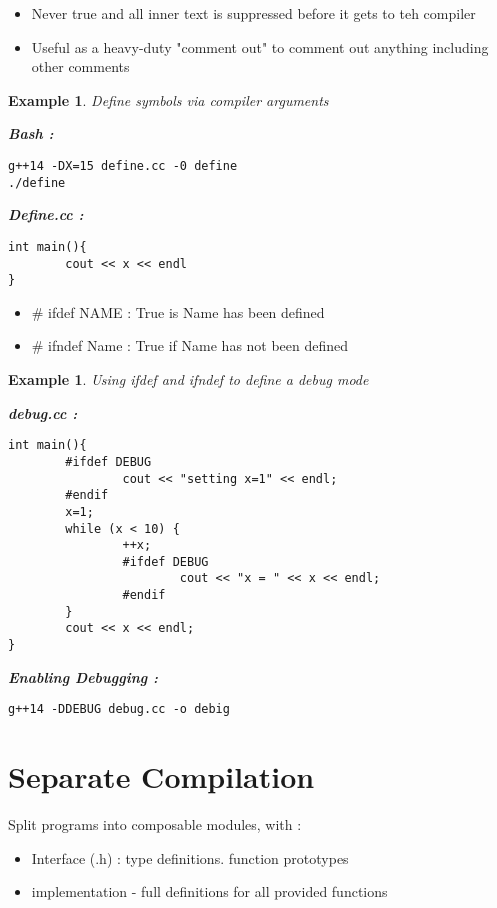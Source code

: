 \documentclass{article}
\newtheorem{ex}[theorem]{Example}
\begin{document}
\begin{itemize}
\item Never true and all inner text is suppressed before it gets to teh compiler
\item Useful as a heavy-duty "comment out" to comment out anything including other comments
\end{itemize}

\begin{ex} Define symbols via compiler arguments 

\textbf{Bash : }
\begin{lstlisting}
g++14 -DX=15 define.cc -0 define 
./define
\end{lstlisting}
\textbf{Define.cc : }
\begin{lstlisting}
int main(){
		cout << x << endl
}
\end{lstlisting}
\end{ex}


\begin{itemize}
\item \# ifdef NAME : True is Name has been defined
\item \# ifndef Name : True if Name has not been defined 
\end{itemize}

\begin{ex} Using ifdef and ifndef to define a debug mode

\textbf{debug.cc :}
\begin{lstlisting}
int main(){
		#ifdef DEBUG
				cout << "setting x=1" << endl;
		#endif 
		x=1;
		while (x < 10) {
				++x;
				#ifdef DEBUG 
						cout << "x = " << x << endl;
				#endif 
		}
		cout << x << endl;
}
\end{lstlisting}

\textbf{Enabling Debugging :}
\begin{lstlisting}
g++14 -DDEBUG debug.cc -o debig 
\end{lstlisting}
\end{ex}

\section{Separate Compilation}

Split programs into composable modules, with : 
\begin{itemize}
\item Interface (.h) : type definitions. function prototypes 
\item implementation - full definitions  for all provided functions 
\end{itemize}
\end{document}
